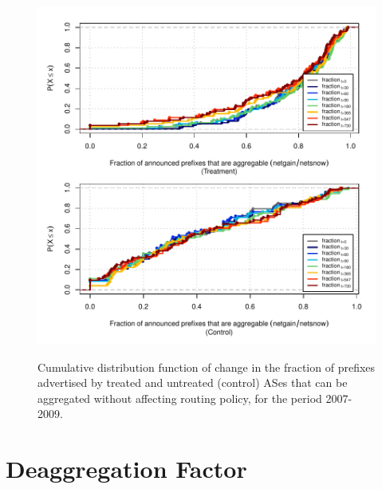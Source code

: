 \clearpage
\vspace*{1.25em}
\begin{figure}[H]
\begin{centering}
\begin{singlespace}
\captionsetup{list=no}
    \includegraphics[width=6in]{figures/behavior-frac_deagg-2007_2009-corr.pdf}
    \vspace{-2em}\\
    \caption{Cumulative distribution function of change in the fraction of
    prefixes advertised by treated and untreated (control) ASes that can be
    aggregated without affecting routing policy, for the period 2007-2009.}
\end{singlespace}
\end{centering}
\end{figure}


\clearpage
\section{Deaggregation Factor}

